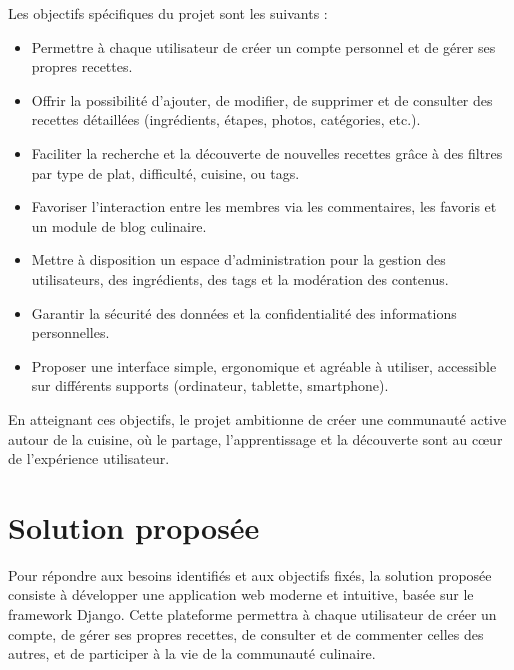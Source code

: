 \documentclass[12pt,a4paper]{report}
\begin{document}
Les objectifs spécifiques du projet sont les suivants :
\begin{itemize}[label=•]
    \item Permettre à chaque utilisateur de créer un compte personnel et de gérer ses propres recettes.
    \item Offrir la possibilité d’ajouter, de modifier, de supprimer et de consulter des recettes détaillées (ingrédients, étapes, photos, catégories, etc.).
    \item Faciliter la recherche et la découverte de nouvelles recettes grâce à des filtres par type de plat, difficulté, cuisine, ou tags.
    \item Favoriser l’interaction entre les membres via les commentaires, les favoris et un module de blog culinaire.
    \item Mettre à disposition un espace d’administration pour la gestion des utilisateurs, des ingrédients, des tags et la modération des contenus.
    \item Garantir la sécurité des données et la confidentialité des informations personnelles.
    \item Proposer une interface simple, ergonomique et agréable à utiliser, accessible sur différents supports (ordinateur, tablette, smartphone).
\end{itemize}

En atteignant ces objectifs, le projet ambitionne de créer une communauté active autour de la cuisine, où le partage, l’apprentissage et la découverte sont au cœur de l’expérience utilisateur.
\section{Solution proposée}

Pour répondre aux besoins identifiés et aux objectifs fixés, la solution proposée consiste à développer une application web moderne et intuitive, basée sur le framework Django. Cette plateforme permettra à chaque utilisateur de créer un compte, de gérer ses propres recettes, de consulter et de commenter celles des autres, et de participer à la vie de la communauté culinaire.
\end{document}

